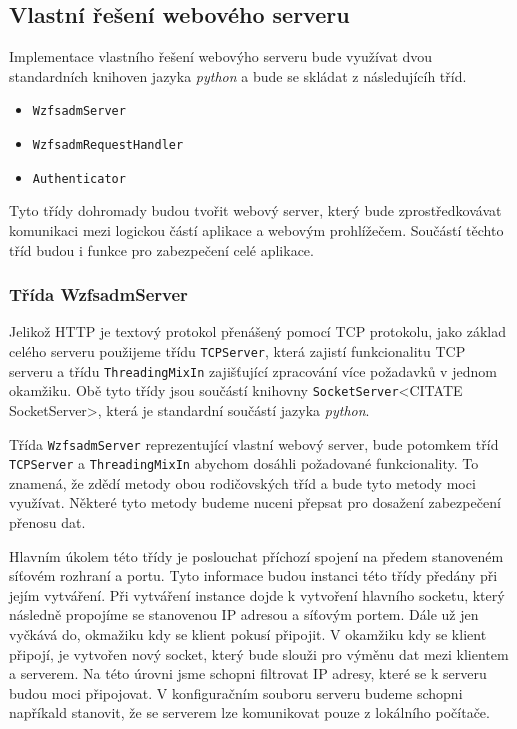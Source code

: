     \subsection{Vlastní řešení webového serveru}
    Implementace vlastního řešení webovýho serveru bude využívat dvou standardních knihoven jazyka \emph{python} a bude se skládat z následujícíh tříd.
    \begin{itemize}
      \item \verb|WzfsadmServer|
      \item \verb|WzfsadmRequestHandler|
      \item \verb|Authenticator|
    \end{itemize}

    Tyto třídy dohromady budou tvořit webový server, který bude zprostředkovávat komunikaci mezi logickou částí aplikace a webovým prohlížečem. Součástí těchto tříd budou i funkce pro zabezpečení celé aplikace.
    \subsubsection{Třída WzfsadmServer}
    Jelikož HTTP je textový protokol přenášený pomocí TCP protokolu, jako základ celého serveru použijeme třídu \verb|TCPServer|, která zajistí funkcionalitu TCP serveru a třídu \verb|ThreadingMixIn| zajišťující zpracování více požadavků v jednom okamžiku. Obě tyto třídy jsou součástí knihovny \verb|SocketServer|<CITATE SocketServer>, která je standardní součástí jazyka \emph{python}.

    Třída \verb|WzfsadmServer| reprezentující vlastní webový server, bude potomkem tříd \verb|TCPServer| a \verb|ThreadingMixIn| abychom dosáhli požadované funkcionality. To znamená, že zdědí metody obou rodičovských tříd a bude tyto metody moci využívat. Některé tyto metody budeme nuceni přepsat pro dosažení zabezpečení přenosu dat.

    Hlavním úkolem této třídy je poslouchat příchozí spojení na předem stanoveném síťovém rozhraní a portu. Tyto informace budou instanci této třídy předány při jejím vytváření. Při vytváření instance dojde k vytvoření hlavního socketu, který následně propojíme se stanovenou IP adresou a síťovým portem. Dále už jen vyčkává do, okmažiku kdy se klient pokusí připojit. V okamžiku kdy se klient připojí, je vytvořen nový socket, který bude slouži pro výměnu dat mezi klientem a serverem. Na této úrovni jsme schopni filtrovat IP adresy, které se k serveru budou moci připojovat. V konfiguračním souboru serveru budeme schopni napříkald stanovit, že se serverem lze komunikovat pouze z lokálního počítače.

